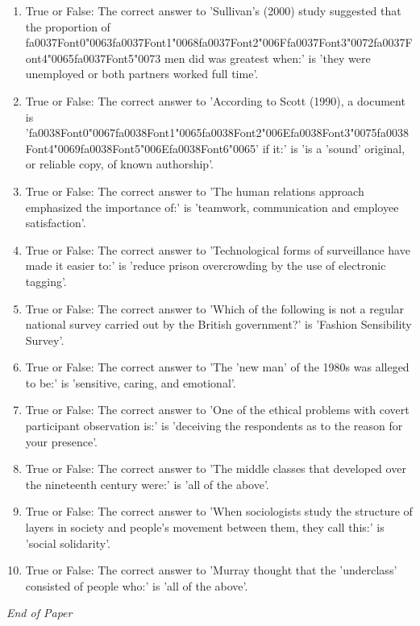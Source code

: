 \documentclass[12pt]{article}
\begin{document}
\begin{enumerate}[label=\arabic*.]
\item True or False: The correct answer to 'Sullivan's (2000) study suggested that the proportion of {\csname fa0037Font0\endcsname\char"0063}{\csname fa0037Font1\endcsname\char"0068}{\csname fa0037Font2\endcsname\char"006F}{\csname fa0037Font3\endcsname\char"0072}{\csname fa0037Font4\endcsname\char"0065}{\csname fa0037Font5\endcsname\char"0073} men did was greatest when:' is 'they were unemployed or both partners worked full time'.
\item True or False: The correct answer to 'According to Scott (1990), a document is '{\csname fa0038Font0\endcsname\char"0067}{\csname fa0038Font1\endcsname\char"0065}{\csname fa0038Font2\endcsname\char"006E}{\csname fa0038Font3\endcsname\char"0075}{\csname fa0038Font4\endcsname\char"0069}{\csname fa0038Font5\endcsname\char"006E}{\csname fa0038Font6\endcsname\char"0065}' if it:' is 'is a 'sound' original, or reliable copy, of known authorship'.
\item True or False: The correct answer to 'The human relations approach emphasized the importance of:' is 'teamwork, communication and employee satisfaction'.
\item True or False: The correct answer to 'Technological forms of surveillance have made it easier to:' is 'reduce prison overcrowding by the use of electronic tagging'.
\item True or False: The correct answer to 'Which of the following is not a regular national survey carried out by the British government?' is 'Fashion Sensibility Survey'.
\item True or False: The correct answer to 'The 'new man' of the 1980s was alleged to be:' is 'sensitive, caring, and emotional'.
\item True or False: The correct answer to 'One of the ethical problems with covert participant observation is:' is 'deceiving the respondents as to the reason for your presence'.
\item True or False: The correct answer to 'The middle classes that developed over the nineteenth century were:' is 'all of the above'.
\item True or False: The correct answer to 'When sociologists study the structure of layers in society and people's movement between them, they call this:' is 'social solidarity'.
\item True or False: The correct answer to 'Murray thought that the 'underclass' consisted of people who:' is 'all of the above'.
\end{enumerate}

\vfill
\noindent\textit{End of Paper}
\end{document}
